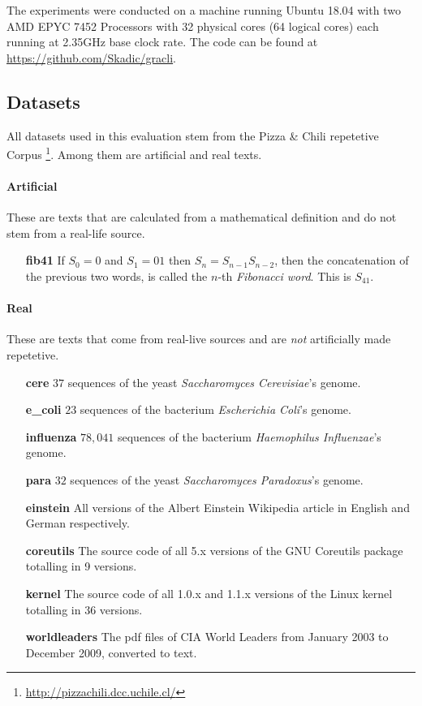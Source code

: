 \documentclass{scrartcl}
\begin{document}
The experiments were conducted on a machine running Ubuntu 18.04 with two AMD EPYC 7452 Processors with 32 physical cores (64 logical cores) each running at 2.35GHz base clock rate.
The code can be found at \url{https://github.com/Skadic/gracli}.

\subsection{Datasets}

All datasets used in this evaluation stem from the Pizza \& Chili repetetive Corpus \footnote{\url{http://pizzachili.dcc.uchile.cl/}}.
Among them are  artificial and real texts.

\paragraph{Artificial}

These are texts that are calculated from a mathematical definition and do not stem from a real-life source.

\begin{itemize}[leftmargin=2cm]
	\item[\textbf{fib41}] If $S_0 = 0$ and $S_1 = 01$ then $S_n = S_{n-1}S_{n-2}$,
		then the concatenation of the previous two words, is called the $n$-th \emph{Fibonacci word}. \cite{barabash_periodic_2016}
		This is $S_{41}$.
\end{itemize}

\paragraph{Real}

These are texts that come from real-live sources and are \emph{not} artificially made repetetive.

\begin{itemize}[leftmargin=2cm]
	\item[\textbf{cere}] $37$ sequences of the yeast \emph{Saccharomyces Cerevisiae}'s genome.
	\item[\textbf{e\_coli}] $23$ sequences of the bacterium \emph{Escherichia Coli}'s genome.
	\item[\textbf{influenza}] $78,041$ sequences of the bacterium \emph{Haemophilus Influenzae}'s genome.
	\item[\textbf{para}] $32$ sequences of the yeast \emph{Saccharomyces Paradoxus}'s genome.
	\item[\textbf{einstein}] All versions of the Albert Einstein Wikipedia article in English and German respectively.
	\item[\textbf{coreutils}] The source code of all 5.x versions of the GNU Coreutils package totalling in 9 versions.
	\item[\textbf{kernel}] The source code of all 1.0.x and 1.1.x versions of the Linux kernel totalling in 36 versions.
	\item[\textbf{worldleaders}] The pdf files of CIA World Leaders from January 2003 to December 2009, converted to text.
\end{itemize}
\end{document}
